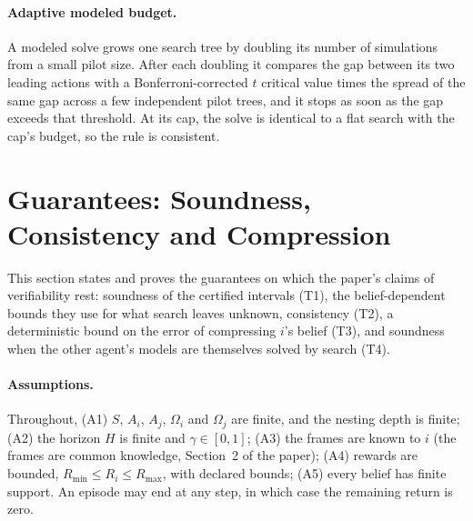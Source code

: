 \documentclass{article}
\begin{document}
\paragraph{Adaptive modeled budget.} A modeled solve grows one search tree by doubling its number of simulations from a small pilot size. After each doubling it compares the gap between its two leading actions with a Bonferroni-corrected $t$ critical value times the spread of the same gap across a few independent pilot trees, and it stops as soon as the gap exceeds that threshold. At its cap, the solve is identical to a flat search with the cap's budget, so the rule is consistent.

\section{Guarantees: Soundness, Consistency and Compression}
\label{sec:theory}

This section states and proves the guarantees on which the paper's claims of verifiability rest: soundness of the certified intervals (T1), the belief-dependent bounds they use for what search leaves unknown, consistency (T2), a deterministic bound on the error of compressing $i$'s belief (T3), and soundness when the other agent's models are themselves solved by search (T4).

\paragraph{Assumptions.} Throughout, (A1) $S$, $A_i$, $A_j$, $\Omega_i$ and $\Omega_j$ are finite, and the nesting depth is finite; (A2) the horizon $H$ is finite and $\gamma \in [0, 1]$; (A3) the frames are known to $i$ (the frames are common knowledge, Section~2 of the paper); (A4) rewards are bounded, $R_{\min} \leq R_i \leq R_{\max}$, with declared bounds; (A5) every belief has finite support. An episode may end at any step, in which case the remaining return is zero.
\end{document}
